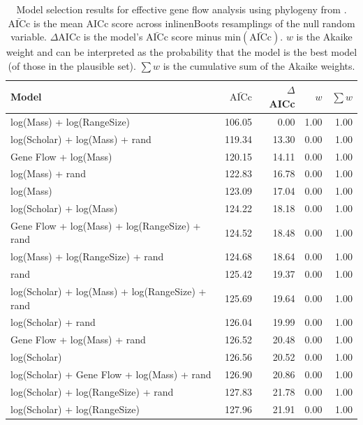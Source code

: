 \begin{table}[ht]
\centering
\caption[
  Full model selection results for effective gene flow analysis with alternative phylogeny. 
]{
  Model selection results for effective gene flow analysis using phylogeny from \cite{jones2005bats}. 
  $\bar{\text{AICc}}$ is the mean AICc score across 
inline{nBoots} resamplings of the null random variable. 
  $\Delta$AICc is the model's $\bar{\text{AICc}}$ score minus $\text{min}(\bar{\text{AICc}})$. 
  $w$ is the Akaike weight and can be interpreted as the probability that the model is the best model (of those in the plausible set).
  $\sum w$ is the cumulative sum of the Akaike weights.
  } 
\label{A-fstModelWeights2}
\begingroup\scriptsize
\begin{tabular}{@{}lrrrr@{}}
  \toprule
Model & $\bar{\text{AICc}}$ & $\Delta$AICc & $w$ & $\sum w$ \\ 
  \midrule
log(Mass) + log(RangeSize) & 106.05 & 0.00 & 1.00 & 1.00 \\ 
  log(Scholar) + log(Mass) + rand & 119.34 & 13.30 & 0.00 & 1.00 \\ 
  Gene Flow + log(Mass) & 120.15 & 14.11 & 0.00 & 1.00 \\ 
  log(Mass) + rand & 122.83 & 16.78 & 0.00 & 1.00 \\ 
  log(Mass) & 123.09 & 17.04 & 0.00 & 1.00 \\ 
  log(Scholar) + log(Mass) & 124.22 & 18.18 & 0.00 & 1.00 \\ 
  Gene Flow + log(Mass) + log(RangeSize) + rand & 124.52 & 18.48 & 0.00 & 1.00 \\ 
  log(Mass) + log(RangeSize) + rand & 124.68 & 18.64 & 0.00 & 1.00 \\ 
  rand & 125.42 & 19.37 & 0.00 & 1.00 \\ 
  log(Scholar) + log(Mass) + log(RangeSize) + rand & 125.69 & 19.64 & 0.00 & 1.00 \\ 
  log(Scholar) + rand & 126.04 & 19.99 & 0.00 & 1.00 \\ 
  Gene Flow + log(Mass) + rand & 126.52 & 20.48 & 0.00 & 1.00 \\ 
  log(Scholar) & 126.56 & 20.52 & 0.00 & 1.00 \\ 
  log(Scholar) + Gene Flow + log(Mass) + rand & 126.90 & 20.86 & 0.00 & 1.00 \\ 
  log(Scholar) + log(RangeSize) + rand & 127.83 & 21.78 & 0.00 & 1.00 \\ 
  log(Scholar) + log(RangeSize) & 127.96 & 21.91 & 0.00 & 1.00 \\ 

\end{tabular}
\end{table}
